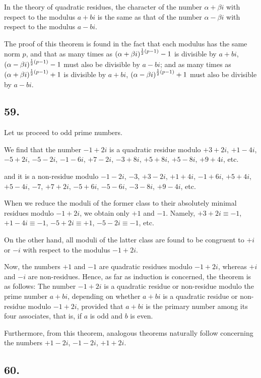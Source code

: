 \documentclass[twoside,12pt]{memoir}
\let\oldfrac\frac
\def\frac#1#2{\mathchoice{\tfrac{#1}{#2}}{\oldfrac{#1}{#2}}{\genfrac{}{}{}{2}{#1}{#2\mathstrut}}{\genfrac{}{}{}{3}{#1}{#2\mathstrut}}}
\begin{document}
In the theory of quadratic residues, the character of the number \(\alpha+\beta i\) with respect to the modulus \(a+b i\) is the same as that of the number \(\alpha-\beta i\) with respect to the modulus \(a-b i\).

The proof of this theorem is found in the fact that each modulus has the same norm \(p\), and that as many times as \((\alpha+\beta i)^{\frac{1}{2}(p-1)}-1\) is divisible by \(a+b i\), \((\alpha-\beta i)^{\frac{1}{2}(p-1)}-1\) must also be divisible by \(a-b i\); and as many times as \((\alpha+\beta i)^{\frac{1}{2}(p-1)}+1\) is divisible by \(a+b i\), \((\alpha-\beta i)^{\frac{1}{2}(p-1)}+1\) must also be divisible by \(a-b i\).

\subsection*{59.}
Let us proceed to odd prime numbers.

We find that the number \(-1+2 i\) is a quadratic residue modulo \(+3+2 i\), \(+1-4 i\), \(-5+2 i\), \(-5-2 i\), \(-1-6 i\), \(+7-2 i\), \(-3+8 i\), \(+5+8 i\), \(+5-8 i\), \(+9+4 i\), etc{.}

and it is a non-residue modulo \(-1-2 i\), \(-3\), \(+3-2 i\), \(+1+4 i\), \(-1+6 i\), \(+5+4 i\), \(+5-4 i\), \(-7\), \(+7+2 i\), \(-5+6 i\), \(-5-6 i\), \(-3-8 i\), \(+9-4 i\), etc{.}

When we reduce the moduli of the former class to their absolutely minimal residues modulo \(-1+2 i\), we obtain only \(+1\) and \(-1\). Namely, \(+3+2 i \equiv -1\), \(+1-4 i \equiv -1\), \(-5+2 i \equiv +1\), \(-5-2 i \equiv -1\), etc{.}

On the other hand, all moduli of the latter class are found to be congruent to \(+i\) or \(-i\) with respect to the modulus \(-1+2 i\).

Now, the numbers \(+1\) and \(-1\) are quadratic residues modulo \(-1+2 i\), whereas \(+i\) and \(-i\) are non-residues. Hence, as far as induction is concerned, the theorem is as follows: The number \(-1+2 i\) is a quadratic residue or non-residue modulo the prime number \(a+b i\), depending on whether \(a+bi\) is a quadratic residue or non-residue modulo \(-1+2 i\), provided that \(a+b i\) is the primary number among its four associates, that is, if \(a\) is odd and \(b\) is even.

Furthermore, from this theorem, analogous theorems naturally follow concerning the numbers \(+1-2 i\), \(-1-2 i\), \(+1+2 i\).

\subsection*{60.}
\end{document}
